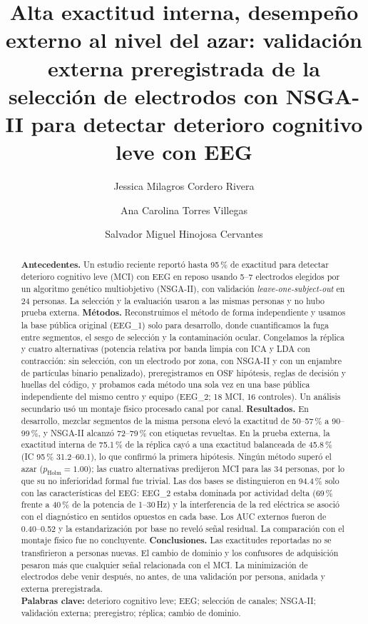 \documentclass[11pt,letterpaper]{article}
\title{\bfseries Alta exactitud interna, desempeño externo al nivel del azar: validación externa preregistrada de la selección de electrodos con NSGA-II para detectar deterioro cognitivo leve con EEG}
\author[1]{Jessica Milagros Cordero Rivera}
\author[1,*]{Ana Carolina Torres Villegas}
\author[1]{Salvador Miguel Hinojosa Cervantes}
\affil[1]{Tecnológico de Monterrey, Campus Guadalajara, Zapopan, Jalisco, Mexico}
\affil[*]{Autora de correspondencia: \href{mailto:torresvillegasanacarolina@gmail.com}{torresvillegasanacarolina@gmail.com}}
\date{}
\begin{document}
\maketitle

\begin{abstract}
\noindent\textbf{Antecedentes.} Un estudio reciente reportó hasta 95\,\% de exactitud para detectar deterioro cognitivo leve (MCI) con EEG en reposo usando 5--7 electrodos elegidos por un algoritmo genético multiobjetivo (NSGA-II), con validación \emph{leave-one-subject-out} en 24 personas. La selección y la evaluación usaron a las mismas personas y no hubo prueba externa.
\textbf{Métodos.} Reconstruimos el método de forma independiente y usamos la base pública original (EEG\_1) solo para desarrollo, donde cuantificamos la fuga entre segmentos, el sesgo de selección y la contaminación ocular. Congelamos la réplica y cuatro alternativas (potencia relativa por banda limpia con ICA y LDA con contracción: sin selección, con un electrodo por zona, con NSGA-II y con un enjambre de partículas binario penalizado), preregistramos en OSF hipótesis, reglas de decisión y huellas del código, y probamos cada método una sola vez en una base pública independiente del mismo centro y equipo (EEG\_2; 18 MCI, 16 controles). Un análisis secundario usó un montaje físico procesado canal por canal.
\textbf{Resultados.} En desarrollo, mezclar segmentos de la misma persona elevó la exactitud de 50--57\,\% a 90--99\,\%, y NSGA-II alcanzó 72--79\,\% con etiquetas revueltas. En la prueba externa, la exactitud interna de 75.1\,\% de la réplica cayó a una exactitud balanceada de 45.8\,\% (IC 95\,\% 31.2--60.1), lo que confirmó la primera hipótesis. Ningún método superó el azar ($p_\text{Holm}=1.00$); las cuatro alternativas predijeron MCI para las 34 personas, por lo que su no inferioridad formal fue trivial. Las dos bases se distinguieron en 94.4\,\% solo con las características del EEG: EEG\_2 estaba dominada por actividad delta (69\,\% frente a 40\,\% de la potencia de 1--30\,Hz) y la interferencia de la red eléctrica se asoció con el diagnóstico en sentidos opuestos en cada base. Los AUC externos fueron de 0.40--0.52 y la estandarización por base no reveló señal residual. La comparación con el montaje físico fue no concluyente.
\textbf{Conclusiones.} Las exactitudes reportadas no se transfirieron a personas nuevas. El cambio de dominio y los confusores de adquisición pesaron más que cualquier señal relacionada con el MCI. La minimización de electrodos debe venir después, no antes, de una validación por persona, anidada y externa preregistrada.\\[4pt]
\noindent\textbf{Palabras clave:} deterioro cognitivo leve; EEG; selección de canales; NSGA-II; validación externa; preregistro; réplica; cambio de dominio.
\end{abstract}
\end{document}
